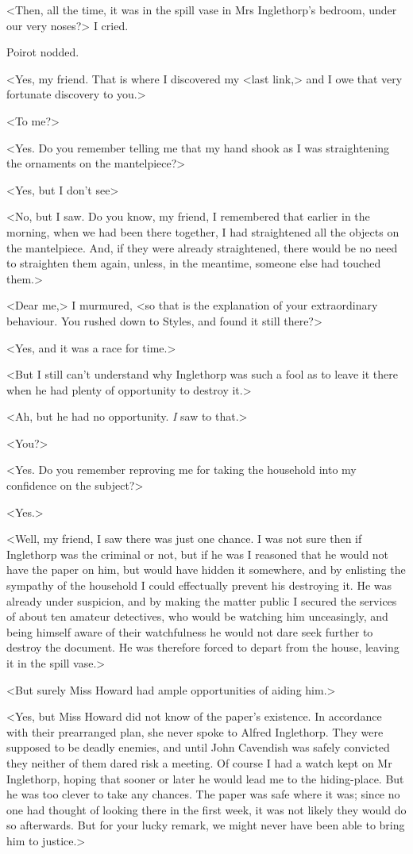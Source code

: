  <Then, all the time, it was in the spill vase in Mrs Inglethorp's bedroom, under our very noses?> I cried. 

 Poirot nodded. 

 <Yes, my friend. That is where I discovered my <last link,> and I owe that very fortunate discovery to you.> 

 <To me?> 

 <Yes. Do you remember telling me that my hand shook as I was straightening the ornaments on the mantelpiece?> 

 <Yes, but I don't see\longdash> 

 <No, but I saw. Do you know, my friend, I remembered that earlier in the morning, when we had been there together, I had straightened all the objects on the mantelpiece. And, if they were already straightened, there would be no need to straighten them again, unless, in the meantime, someone else had touched them.> 

 <Dear me,> I murmured, <so that is the explanation of your extraordinary behaviour. You rushed down to Styles, and found it still there?> 

 <Yes, and it was a race for time.> 

 <But I still can't understand why Inglethorp was such a fool as to leave it there when he had plenty of opportunity to destroy it.> 

 <Ah, but he had no opportunity. \emph{I} saw to that.> 

 <You?> 

 <Yes. Do you remember reproving me for taking the household into my confidence on the subject?> 

 <Yes.> 

 <Well, my friend, I saw there was just one chance. I was not sure then if Inglethorp was the criminal or not, but if he was I reasoned that he would not have the paper on him, but would have hidden it somewhere, and by enlisting the sympathy of the household I could effectually prevent his destroying it. He was already under suspicion, and by making the matter public I secured the services of about ten amateur detectives, who would be watching him unceasingly, and being himself aware of their watchfulness he would not dare seek further to destroy the document. He was therefore forced to depart from the house, leaving it in the spill vase.> 

 <But surely Miss Howard had ample opportunities of aiding him.> 

 <Yes, but Miss Howard did not know of the paper's existence. In accordance with their prearranged plan, she never spoke to Alfred Inglethorp. They were supposed to be deadly enemies, and until John Cavendish was safely convicted they neither of them dared risk a meeting. Of course I had a watch kept on Mr Inglethorp, hoping that sooner or later he would lead me to the hiding-place. But he was too clever to take any chances. The paper was safe where it was; since no one had thought of looking there in the first week, it was not likely they would do so afterwards. But for your lucky remark, we might never have been able to bring him to justice.> 


